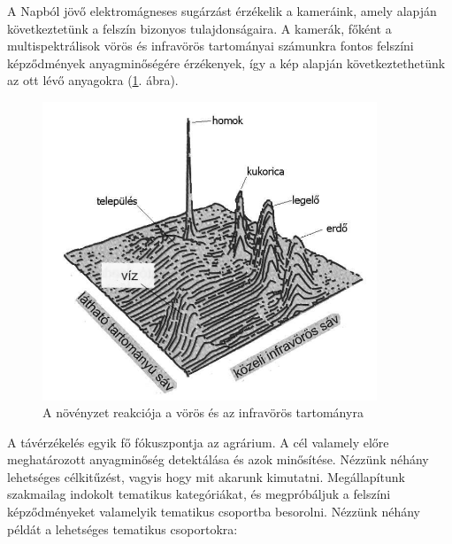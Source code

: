 \documentclass[a4paper,12pt]{article}
\begin{document}
A Napból jövő elektromágneses sugárzást érzékelik a kameráink, amely alapján következtetünk a felszín bizonyos tulajdonságaira. A kamerák, főként a multispektrálisok vörös és infravörös tartományai számunkra fontos felszíni képződmények anyagminőségére érzékenyek, így a kép alapján következtethetünk az ott lévő anyagokra (\ref{fig:rs2}. ábra).

\begin{figure}
	\centering
	\includegraphics[width=10cm]{rs2.png}
	\caption{A növényzet reakciója a vörös és az infravörös tartományra}
	\label{fig:rs2}
\end{figure}


A távérzékelés egyik fő fókuszpontja az agrárium. A cél valamely előre meghatározott anyagminőség detektálása és azok  minősítése. Nézzünk néhány lehetséges célkitűzést, vagyis hogy mit akarunk kimutatni. Megállapítunk szakmailag indokolt tematikus kategóriákat, és megpróbáljuk a felszíni képződményeket valamelyik tematikus csoportba besorolni. Nézzünk néhány példát a lehetséges tematikus csoportokra:
\end{document}
